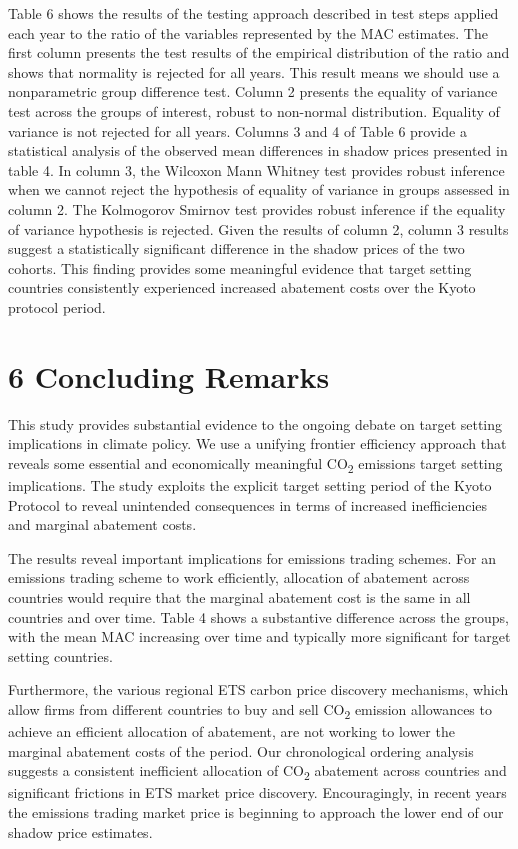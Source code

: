 \documentclass[
  10pt,
]{article}
\begin{document}
Table 6 shows the results of the testing approach described in test
steps applied each year to the ratio of the variables represented by the
MAC estimates. The first column presents the test results of the
empirical distribution of the ratio and shows that normality is rejected
for all years. This result means we should use a nonparametric group
difference test. Column 2 presents the equality of variance test across
the groups of interest, robust to non-normal distribution. Equality of
variance is not rejected for all years. Columns 3 and 4 of Table 6
provide a statistical analysis of the observed mean differences in
shadow prices presented in table 4. In column 3, the Wilcoxon Mann
Whitney test provides robust inference when we cannot reject the
hypothesis of equality of variance in groups assessed in column 2. The
Kolmogorov Smirnov test provides robust inference if the equality of
variance hypothesis is rejected. Given the results of column 2, column 3
results suggest a statistically significant difference in the shadow
prices of the two cohorts. This finding provides some meaningful
evidence that target setting countries consistently experienced
increased abatement costs over the Kyoto protocol period.

\hypertarget{concluding-remarks}{%
\section{6 Concluding Remarks}\label{concluding-remarks}}

This study provides substantial evidence to the ongoing debate on target
setting implications in climate policy. We use a unifying frontier
efficiency approach that reveals some essential and economically
meaningful CO\textsubscript{2} emissions target setting implications.
The study exploits the explicit target setting period of the Kyoto
Protocol to reveal unintended consequences in terms of increased
inefficiencies and marginal abatement costs.

The results reveal important implications for emissions trading schemes.
For an emissions trading scheme to work efficiently, allocation of
abatement across countries would require that the marginal abatement
cost is the same in all countries and over time. Table 4 shows a
substantive difference across the groups, with the mean MAC increasing
over time and typically more significant for target setting countries.

Furthermore, the various regional ETS carbon price discovery mechanisms,
which allow firms from different countries to buy and sell
CO\textsubscript{2} emission allowances to achieve an efficient
allocation of abatement, are not working to lower the marginal abatement
costs of the period. Our chronological ordering analysis suggests a
consistent inefficient allocation of CO\textsubscript{2} abatement
across countries and significant frictions in ETS market price
discovery. Encouragingly, in recent years the emissions trading market
price is beginning to approach the lower end of our shadow price
estimates.
\end{document}
